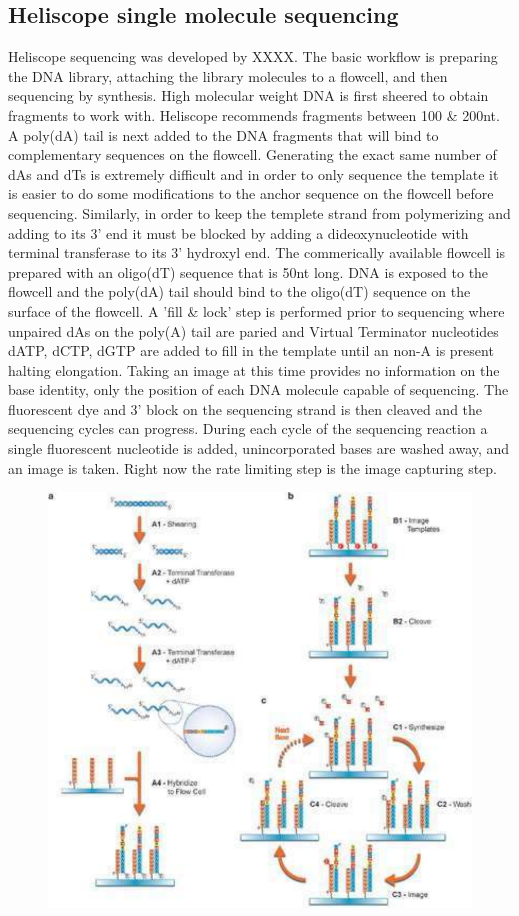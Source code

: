 \documentclass{report}\usepackage[]{graphicx}\usepackage[]{color}
\begin{document}
\subsection*{Heliscope single molecule sequencing}
Heliscope sequencing was developed by XXXX. 
The basic workflow is preparing the DNA library, attaching the library molecules to 
a flowcell, and then sequencing by synthesis. High molecular weight DNA is first 
sheered to obtain fragments to work with. Heliscope recommends fragments between 100 \&
200nt. A poly(dA) tail is next added to the DNA fragments that will bind to complementary 
sequences on the flowcell. Generating the exact same number of dAs and dTs is extremely difficult
and in order to only sequence the template it is easier to do some modifications to the 
anchor sequence on the flowcell before sequencing. Similarly, in order to keep the templete strand from 
polymerizing and adding
to its 3' end it must be blocked by adding a dideoxynucleotide with terminal transferase to 
its 3' hydroxyl end. The commerically available flowcell is prepared with an oligo(dT) sequence that is 50nt 
long. DNA is exposed to the flowcell and the poly(dA) tail should bind to the oligo(dT) sequence
on the surface of the flowcell. A 'fill \& lock' step is performed prior to sequencing where unpaired
dAs on the poly(A) tail are paried and Virtual Terminator nucleotides dATP, dCTP, dGTP are added
to fill in the template until an non-A is present halting elongation. Taking an image at this time
provides no information on the base identity, only the position of each DNA molecule 
capable of sequencing. The fluorescent dye and 3' block on the sequencing strand is then cleaved 
and the sequencing cycles can progress. During each cycle of the sequencing reaction 
a single fluorescent nucleotide is added, unincorporated bases are washed away, and an image 
is taken. Right now the rate limiting step is the image capturing step. 

\begin{figure}[H]
\centering
    \includegraphics[width=.4\textwidth]{images/Helicos.pdf}
    \caption{}\label{fig:Nanoball} 
\end{figure}
\end{document}
